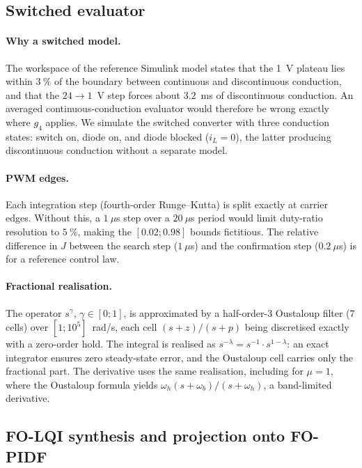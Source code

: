 \subsection{Switched evaluator}

\paragraph{Why a switched model.}
The workspace of the reference Simulink model states that the 1~V plateau
lies within $3~\%$ of the boundary between continuous and discontinuous
conduction, and that the $24\to1$~V step forces about $3.2$~ms of
discontinuous conduction. An averaged continuous-conduction evaluator would
therefore be wrong exactly where $g_4$ applies. We simulate the switched
converter with three conduction states: switch on, diode on, and diode
blocked ($i_L=0$), the latter producing discontinuous conduction without a
separate model.

\paragraph{PWM edges.}
Each integration step (fourth-order Runge--Kutta) is split exactly at carrier
edges. Without this, a $1~\mu$s step over a $20~\mu$s period would limit
duty-ratio resolution to $5~\%$, making the $[0.02;0.98]$ bounds fictitious.
The relative difference in $J$ between the search step ($1~\mu$s) and the
confirmation step ($0.2~\mu$s) is \ChiffreEcartPas{} for a reference control
law.

\paragraph{Fractional realisation.}
The operator $s^\gamma$, $\gamma\in[0;1]$, is approximated by a
half-order-3 Oustaloup filter (7 cells) over $[1;10^5]$~rad/s, each cell
$(s+z)/(s+p)$ being discretised exactly with a zero-order hold. The integral
is realised as $s^{-\lambda}=s^{-1}\cdot s^{1-\lambda}$: an exact integrator
ensures zero steady-state error, and the Oustaloup cell carries only the
fractional part. The derivative uses the same realisation, including for
$\mu=1$, where the Oustaloup formula yields $\omega_h(s+\omega_b)/(s+\omega_h)$,
a band-limited derivative.

\subsection{FO-LQI synthesis and projection onto FO-PIDF}

